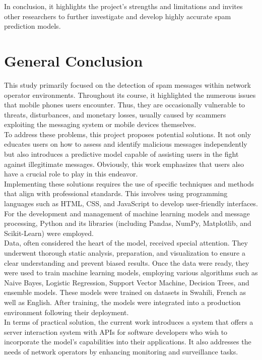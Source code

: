 \documentclass[12pt,a4paper, oneside]{book}
\begin{document}
In conclusion, it highlights the project's strengths and limitations and invites other researchers to further investigate and develop highly accurate spam prediction models.\\

\chapter*{General Conclusion} 
This study primarily focused on the detection of spam messages within network operator environments. Throughout its course, it highlighted the numerous issues that mobile phones users encounter. Thus, they are occasionally vulnerable to threats, disturbances, and monetary losses, usually caused by scammers exploiting the messaging system or mobile devices themselves.\\

To address these problems, this project proposes potential solutions. It not only educates users on how to assess and identify malicious messages independently but also introduces a predictive model capable of assisting users in the fight against illegitimate messages. Obviously, this work emphasizes that users also have a crucial role to play in this endeavor.\\

Implementing these solutions requires the use of specific techniques and methods that align with professional standards. This involves using programming languages such as HTML, CSS, and JavaScript to develop user-friendly interfaces. For the development and management of machine learning models and message processing, Python and its libraries (including Pandas, NumPy, Matplotlib, and Scikit-Learn) were employed.\\

Data, often considered the heart of the model, received special attention. They underwent thorough static analysis, preparation, and visualization to ensure a clear understanding and prevent biased results. Once the data were ready, they were used to train machine learning models, employing various algorithms such as Naive Bayes, Logistic Regression, Support Vector Machine, Decision Trees, and ensemble models. These models were trained on datasets in Swahili, French as well as English. After training, the models were integrated into a production environment following their deployment.\\

In terms of practical solution, the current work introduces a system that offers a server interaction system with APIs for software developers who wish to incorporate the model's capabilities into their applications. It also addresses the needs of network operators by enhancing monitoring and surveillance tasks.\\
\end{document}
